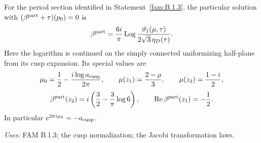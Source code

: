 \begin{proposition}[FAM C.1.1; T]\label{fam:C.1.1}
For the period section identified in Statement~\ref{fam:B.1.3}, the particular solution
with \((\beta^{\rm part}+\tau)(p_0)=0\) is
\begin{equation}\label{fam:eq:cd-beta}
 \beta^{\rm part}=\frac{6i}{\pi}\operatorname{Log}
 \frac{\vartheta_1(\mu,\tau)}{2\sqrt3\,\eta_D(\tau)}.
\end{equation}
Here the logarithm is continued on the simply connected uniformizing
half-plane from its cusp expansion. Its special values are
\[
 \mu_0=\frac12-\frac{i\log a_{\rm cusp}}{2\pi},\qquad
 \mu(z_1)=\frac{2-\rho}{3},\qquad \mu(z_2)=\frac{1-i}{2},
\]
\[
 \beta^{\rm part}(z_2)=i\left(\frac32-\frac3\pi\log6\right),
 \qquad \operatorname{Re}\beta^{\rm part}(z_1)=-\frac12.
\]
In particular \(e^{2\pi i\mu_0}=-a_{\rm cusp}\).
\end{proposition}
\noindent\textit{Uses:} FAM B.1.3; the cusp normalization; the Jacobi transformation laws.\par
